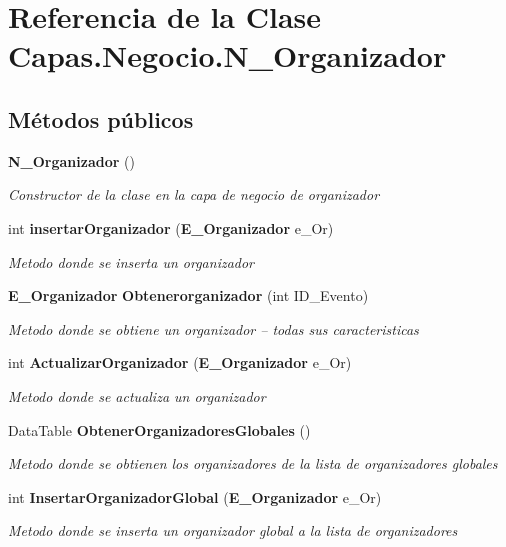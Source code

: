 \section{Referencia de la Clase Capas.\+Negocio.\+N\+\_\+\+Organizador}
\label{class_capas_1_1_negocio_1_1_n___organizador}
\subsection*{Métodos públicos}
\begin{DoxyCompactItemize}
\item 
{\bf N\+\_\+\+Organizador} ()
\begin{DoxyCompactList}\small\item\em Constructor de la clase en la capa de negocio de organizador \end{DoxyCompactList}\item 
int {\bf insertar\+Organizador} ({\bf E\+\_\+\+Organizador} e\+\_\+\+Or)
\begin{DoxyCompactList}\small\item\em Metodo donde se inserta un organizador \end{DoxyCompactList}\item 
{\bf E\+\_\+\+Organizador} {\bf Obtenerorganizador} (int I\+D\+\_\+\+Evento)
\begin{DoxyCompactList}\small\item\em Metodo donde se obtiene un organizador -- todas sus caracteristicas \end{DoxyCompactList}\item 
int {\bf Actualizar\+Organizador} ({\bf E\+\_\+\+Organizador} e\+\_\+\+Or)
\begin{DoxyCompactList}\small\item\em Metodo donde se actualiza un organizador \end{DoxyCompactList}\item 
Data\+Table {\bf Obtener\+Organizadores\+Globales} ()
\begin{DoxyCompactList}\small\item\em Metodo donde se obtienen los organizadores de la lista de organizadores globales \end{DoxyCompactList}\item 
int {\bf Insertar\+Organizador\+Global} ({\bf E\+\_\+\+Organizador} e\+\_\+\+Or)
\begin{DoxyCompactList}\small\item\em Metodo donde se inserta un organizador global a la lista de organizadores \end{DoxyCompactList}\item 

\end{DoxyCompactItemize}
